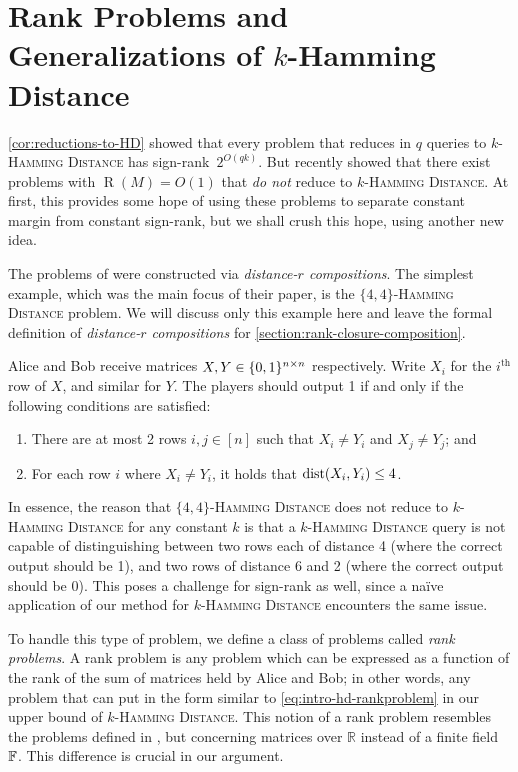 \documentclass{article}
\DeclareMathOperator{\Rand}{R}
\newcommand{\R}{\mathbb{R}}
\begin{document}
\section{Rank Problems and Generalizations of \texorpdfstring{$k$}{k}-Hamming Distance}
\label{section:rank-problems}

\cref{cor:reductions-to-HD} showed that every problem that reduces in $q$ queries to \textsc{$k$-Hamming Distance} has sign-rank~$2^{O(qk)}$. But \cite{FGHH25} recently showed that there
exist problems with $\Rand(M) = O(1)$ that \emph{do not} reduce to
\textsc{$k$-Hamming Distance}. At first, this provides some hope of using these
problems to separate constant margin from constant sign-rank, but we shall crush
this hope, using another new idea.

The problems of \cite{FGHH25} were constructed via \emph{distance-$r$
compositions}. The simplest example, which was the main focus of their paper, is
the \textsc{$\{4,4\}$-Hamming Distance} problem. We will discuss only this
example here and leave the formal definition of \emph{distance-$r$ compositions} for
\cref{section:rank-closure-composition}.

\begin{boxexample}
\label{ex:44-hamming-distance}
Alice and Bob receive matrices $X, Y \in \{0,1\}^{n \times n}$ respectively. Write
$X_i$ for the $i^\mathrm{th}$ row of $X$, and similar for $Y$. The players
should output 1 if and only if the following conditions are satisfied:
\begin{enumerate}
    \item There are at most 2 rows $i,j \in [n]$ such that $X_i \neq Y_i$ and $X_j \neq Y_j$; and
    \item For each row $i$ where $X_i \neq Y_i$, it holds that $\operatorname{dist}(X_i, Y_i) \leq 4$.
\end{enumerate}
\end{boxexample}
In essence, the reason that \textsc{$\{4,4\}$-Hamming Distance} does not reduce
to \textsc{$k$-Hamming Distance} for any constant $k$ is that a
\textsc{$k$-Hamming Distance} query is not capable of distinguishing between two
rows each of distance 4 (where the correct output should be 1), and two rows of
distance 6 and 2 (where the correct output should be 0). This poses a challenge
for sign-rank as well, since a na\"ive application of our method for
\textsc{$k$-Hamming Distance} encounters the same issue.

To handle this type of problem, we define a class of
problems called \emph{rank problems}. A rank problem is any problem which can be
expressed as a function of the rank of the sum of matrices held by Alice and Bob; in other words, any problem that can
put in the form similar to \cref{eq:intro-hd-rankproblem} in our upper bound of
\textsc{$k$-Hamming Distance}. This notion of a rank problem resembles the problems defined in \cite{SS24}, but concerning matrices over $\R$ instead of a finite field $\mathbb{F}$. This difference is crucial in our argument.
\end{document}
